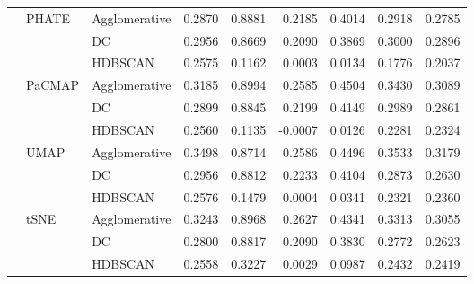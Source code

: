\begin{tabular}{lllrrrrrr}
\cline{2-9}
 & \multirow[t]{3}{*}{PHATE} & Agglomerative & 0.2870 & 0.8881 & 0.2185 & 0.4014 & 0.2918 & 0.2785 \\
 &  & DC & 0.2956 & 0.8669 & 0.2090 & 0.3869 & 0.3000 & 0.2896 \\
 &  & HDBSCAN & 0.2575 & 0.1162 & 0.0003 & 0.0134 & 0.1776 & 0.2037 \\
\cline{2-9}
 & \multirow[t]{3}{*}{PaCMAP} & Agglomerative & 0.3185 & 0.8994 & 0.2585 & 0.4504 & 0.3430 & 0.3089 \\
 &  & DC & 0.2899 & 0.8845 & 0.2199 & 0.4149 & 0.2989 & 0.2861 \\
 &  & HDBSCAN & 0.2560 & 0.1135 & -0.0007 & 0.0126 & 0.2281 & 0.2324 \\
\cline{2-9}
 & \multirow[t]{3}{*}{UMAP} & Agglomerative & 0.3498 & 0.8714 & 0.2586 & 0.4496 & 0.3533 & 0.3179 \\
 &  & DC & 0.2956 & 0.8812 & 0.2233 & 0.4104 & 0.2873 & 0.2630 \\
 &  & HDBSCAN & 0.2576 & 0.1479 & 0.0004 & 0.0341 & 0.2321 & 0.2360 \\
\cline{2-9}
 & \multirow[t]{3}{*}{tSNE} & Agglomerative & 0.3243 & 0.8968 & 0.2627 & 0.4341 & 0.3313 & 0.3055 \\
 &  & DC & 0.2800 & 0.8817 & 0.2090 & 0.3830 & 0.2772 & 0.2623 \\
 &  & HDBSCAN & 0.2558 & 0.3227 & 0.0029 & 0.0987 & 0.2432 & 0.2419 \\
\cline{1-9} \cline{2-9}
\bottomrule
\end{tabular}
